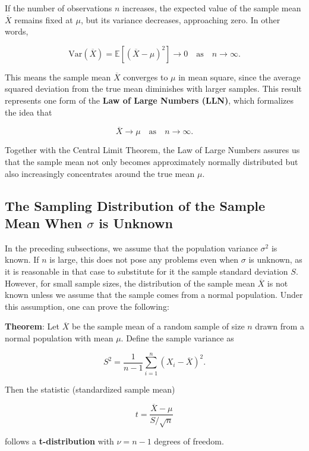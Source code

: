 \documentclass[twoside]{book}
\begin{document}
If the number of observations \( n \) increases, the expected value of the sample mean \( \overline{X} \) remains fixed at \( \mu \), but its variance decreases, approaching zero. In other words,

\[
\mathrm{Var}(\overline{X}) = \mathbb{E}\left[(\overline{X} - \mu)^2\right] \to 0 \quad \text{as} \quad n \to \infty.
\]

This means the sample mean \( \overline{X} \) converges to \( \mu \) in mean square, since the average squared deviation from the true mean diminishes with larger samples. This result represents one form of the \textbf{Law of Large Numbers (LLN)}, which formalizes the idea that

\[
\overline{X} \to \mu \quad \text{as} \quad n \to \infty.
\]

Together with the Central Limit Theorem, the Law of Large Numbers assures us that the sample mean not only becomes approximately normally distributed but also increasingly concentrates around the true mean \( \mu \).

\subsection{The Sampling Distribution of the Sample Mean When $\sigma$ is Unknown}
In the preceding subsections, we assume that the population variance $\sigma^2$ is known. If $n$ is large, this does not pose any problems even when $\sigma$ is unknown, as it is reasonable in that case to substitute for it the sample standard deviation $S$. However, for small sample sizes, the distribution of the sample mean $\overline{X}$ is not known unless we assume that the  sample comes from a normal population. Under this assumption, one can prove the following:

\begin{textbox}
\textbf{Theorem}: Let \( \overline{X} \) be the sample mean of a random sample of size \( n \) drawn from a normal population with mean \( \mu \). Define the sample variance as

\[
S^2 = \frac{1}{n - 1} \sum_{i=1}^n (X_i - \overline{X})^2.
\]

Then the statistic (standardized sample mean)

\[
t = \frac{\overline{X} - \mu}{S / \sqrt{n}}
\]

follows a \textbf{t-distribution} with \( \nu = n - 1 \) degrees of freedom.

\end{textbox}
\end{document}
